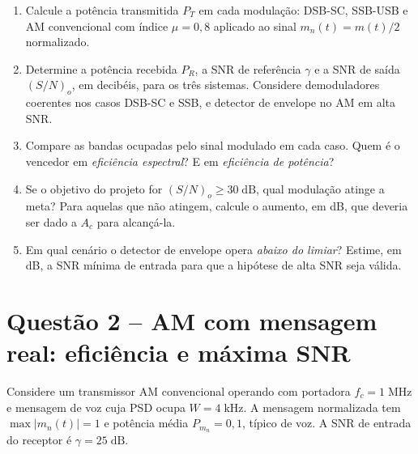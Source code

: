 \documentclass[11pt,a4paper]{article}
\begin{document}
\begin{enumerate}[label=\alph*)]
  \item Calcule a potência transmitida $P_T$ em cada modulação: DSB-SC, SSB-USB e AM convencional com índice $\mu = 0{,}8$ aplicado ao sinal $m_n(t) = m(t)/2$ normalizado.
  \item Determine a potência recebida $P_R$, a SNR de referência $\gamma$ e a SNR de saída $(S/N)_o$, em decibéis, para os três sistemas. Considere demoduladores coerentes nos casos DSB-SC e SSB, e detector de envelope no AM em alta SNR.
  \item Compare as bandas ocupadas pelo sinal modulado em cada caso. Quem é o vencedor em \emph{eficiência espectral}? E em \emph{eficiência de potência}?
  \item Se o objetivo do projeto for $(S/N)_o \ge 30\;\text{dB}$, qual modulação atinge a meta? Para aquelas que não atingem, calcule o aumento, em dB, que deveria ser dado a $A_c$ para alcançá-la.
  \item Em qual cenário o detector de envelope opera \emph{abaixo do limiar}? Estime, em dB, a SNR mínima de entrada para que a hipótese de alta SNR seja válida.
\end{enumerate}

\section*{Questão 2 -- AM com mensagem real: eficiência e máxima SNR}

Considere um transmissor AM convencional operando com portadora $f_c = 1\;\text{MHz}$ e mensagem de voz cuja PSD ocupa $W = 4\;\text{kHz}$. A mensagem normalizada tem $\max|m_n(t)| = 1$ e potência média $P_{m_n} = 0{,}1$, típico de voz. A SNR de entrada do receptor é $\gamma = 25\;\text{dB}$.
\end{document}
